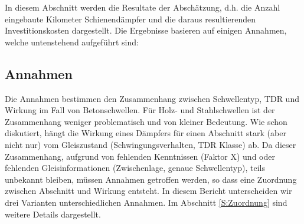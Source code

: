 In diesem Abschnitt werden die Resultate der Abschätzung, d.h. die Anzahl eingebaute Kilometer Schienendämpfer und die daraus resultierenden Investitionskosten dargestellt.
Die Ergebnisse basieren auf einigen Annahmen, welche untenstehend aufgeführt sind: 
\subsection{Annahmen}\label{S:annh}
Die  Annahmen  bestimmen den Zusammenhang zwischen Schwellentyp, TDR und Wirkung im Fall von Betonschwellen. Für Holz- und Stahlschwellen ist der Zusammenhang weniger problematisch und von kleiner Bedeutung. Wie schon diskutiert, hängt die Wirkung eines Dämpfers für einen Abschnitt stark (aber nicht nur) vom Gleiszustand (Schwingungsverhalten, TDR Klasse) ab. Da dieser Zusammenhang, aufgrund von fehlenden Kenntnissen (Faktor X) und oder fehlenden Gleisinformationen (Zwischenlage, genaue Schwellentyp), teils unbekannt bleiben, müssen Annahmen getroffen werden, so dass eine Zuordnung zwischen Abschnitt und Wirkung entsteht. In diesem Bericht unterscheiden wir drei Varianten unterschiedlichen Annahmen. Im Abschnitt \ref{S:Zuordnung} sind weitere Details dargestellt. 

